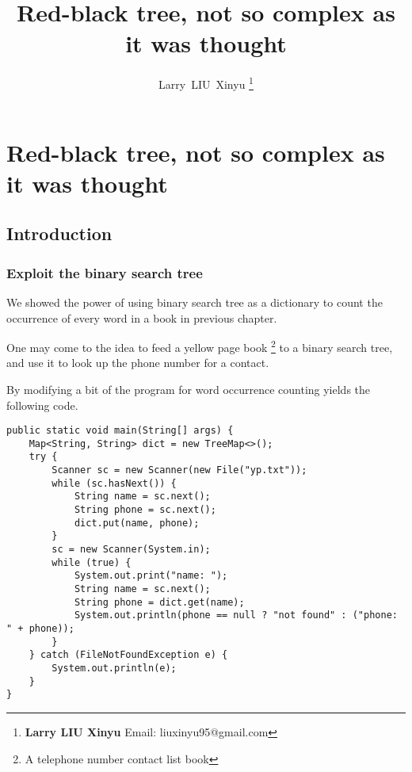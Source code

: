 \documentclass{article}
\begin{document}


\title{Red-black tree, not so complex as it was thought}

\author{Larry~LIU~Xinyu
\thanks{{\bfseries Larry LIU Xinyu } \newline
  Email: liuxinyu95@gmail.com \newline}
  }

\maketitle
\fi


\ifx\wholebook\relax
\chapter{Red-black tree, not so complex as it was thought}
\fi

\section{Introduction}
\label{introduction} 

\subsection{Exploit the binary search tree}
We showed the power of using binary search tree as a dictionary
to count the occurrence of every word in a book in previous chapter.

One may come to the idea to feed a yellow page book
\footnote{A telephone number contact list book} to a binary
search tree, and use it to look up the phone number for a contact.

By modifying a bit of the program for word occurrence counting
yields the following code.

\begin{lstlisting}
public static void main(String[] args) {
    Map<String, String> dict = new TreeMap<>();
    try {
        Scanner sc = new Scanner(new File("yp.txt"));
        while (sc.hasNext()) {
            String name = sc.next();
            String phone = sc.next();
            dict.put(name, phone);
        }
        sc = new Scanner(System.in);
        while (true) {
            System.out.print("name: ");
            String name = sc.next();
            String phone = dict.get(name);
            System.out.println(phone == null ? "not found" : ("phone: " + phone));
        }
    } catch (FileNotFoundException e) {
        System.out.println(e);
    }
}
\end{lstlisting}
\end{document}
